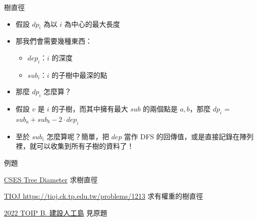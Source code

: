 \documentclass[aspectratio=169]{beamer}
\begin{document}
    \begin{frame}{樹直徑}
        \begin{itemize}
            \item<1-> 假設 $dp_i$ 為以 $i$ 為中心的最大長度
            \item<2-> 那我們會需要幾種東西：
            \begin{itemize}
                \item<2-> $dep_i$：$i$ 的深度
                \item<2-> $sub_i$：$i$ 的子樹中最深的點
            \end{itemize} 
            \item<3-> 那麼 $dp_i$ 怎麼算？
            \item<4-> 假設 $v$ 是 $i$ 的子樹，而其中擁有最大 $sub$ 的兩個點是 $a, b$，那麼 $dp_i$ = $sub_a + sub_b - 2 \cdot dep_i$
            \item<5-> 至於 $sub_i$ 怎麼算呢？簡單，把 $dep$ 當作 DFS 的回傳值，或是直接記錄在陣列裡，就可以收集到所有子樹的資料了！
        \end{itemize}
    \end{frame}

    \begin{frame}{例題}
        \begin{block}{\href{https://cses.fi/problemset/task/1131}{CSES Tree Diameter}}
            求樹直徑
        \end{block}

        \begin{block}{\href{https://tioj.ck.tp.edu.tw/problems/1213}{TIOJ https://tioj.ck.tp.edu.tw/problems/1213}}
            求有權重的樹直徑
        \end{block}

        \begin{block}{\href{https://tioj.ck.tp.edu.tw/problems/2189}{2022 TOIP B. 建設人工島}}
            見原題
        \end{block}
    \end{frame}
\end{document}
